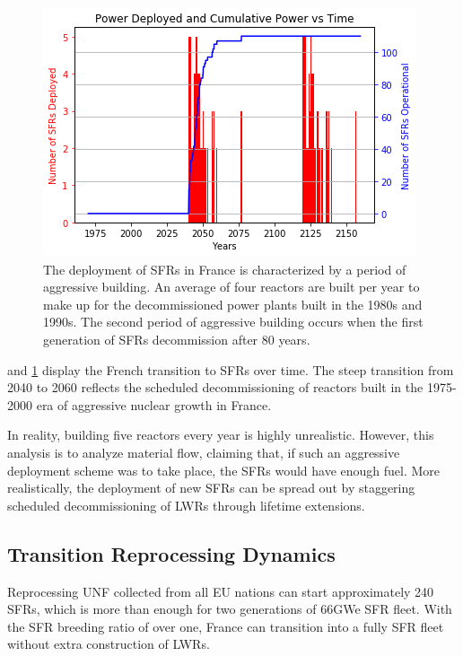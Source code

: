 \begin{figure}[htbp!]
    \begin{center}
        \includegraphics[scale=0.6]{./images/french-transition/sfr_deploy.png}
    \caption{The deployment of \glspl{SFR} in France is characterized by a period of
             aggressive building. An average of four reactors are built per year to
             make up for the decommissioned power plants built in the 1980s and 1990s.
             The second period of aggressive building occurs when the first generation
             of \glspl{SFR} decommission after 80 years.}
    \label{fig:dep}
    \end{center}
\end{figure}

 and \cref{fig:dep} display
the French transition to \glspl{SFR} over time.
The steep transition from 2040 to 2060 reflects the scheduled
decommissioning of reactors built in the 1975-2000
era of aggressive nuclear growth in France.

In reality, building five reactors every year is highly unrealistic. However,
this analysis is to analyze material flow, claiming that, if such an aggressive
deployment scheme was to take place, the \glspl{SFR} would have enough fuel.
More realistically, the deployment of new \glspl{SFR} can be spread out by
staggering scheduled decommissioning of \glspl{LWR} through lifetime extensions.

\FloatBarrier
\subsection{Transition Reprocessing Dynamics}

Reprocessing \gls{UNF} collected from all EU nations can start approximately
240 \glspl{SFR}, which is more than enough for two generations of 66GWe \gls{SFR}
fleet. With the \gls{SFR} breeding ratio of over one, France can transition into
a fully \gls{SFR} fleet without extra construction of \glspl{LWR}. 

